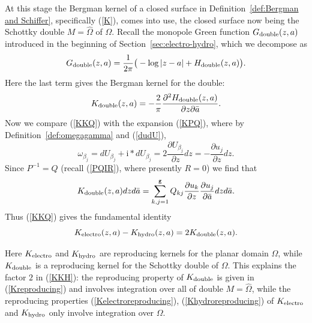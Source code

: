 \documentclass[reqno,12pt]{article}
\theoremstyle{plain}
\theoremstyle{definition}
\numberwithin{equation}{section}
\numberwithin{figure}{section}
\def\I{\mathrm{i}}
\begin{document}
At this stage the Bergman kernel of a closed surface in Definition~\ref{def:Bergman and Schiffer},
specifically (\ref{K}), comes into use, the closed surface now being the Schottky double $M=\hat{\Omega}$ of $\Omega$. 
Recall the monopole Green function $G_{\rm double}(z,a)$ introduced in the beginning of Section~\ref{sec:electro-hydro},
which we decompose as
\begin{equation}\label{Gdouble}
G_{\rm double}(z,a)=\frac{1}{2\pi}\big(-\log |z-a|+H_{\rm double}(z,a)\big).
\end{equation}
Here the last term gives the Bergman kernel for the double:
\begin{equation}
\label{KdoubleH}
K_{\rm double}(z,a)=-\frac{2}{\pi}\frac{\partial^2 H_{\rm double}(z,a)}{\partial z \partial\bar{a}}.
\end{equation}
Now we compare (\ref{KKQ}) with the expansion (\ref{KPQ}), where by Definition~\ref{def:omegagamma}
and (\ref{dudU}),
$$
\omega_{\beta_j}=dU_{\beta_j}+\I*dU_{\beta_j}=2\frac{\partial U_{\beta_j}}{\partial z}dz
=-\frac{\partial u_j}{\partial z}dz.
$$
Since $P^{-1}=Q$ (recall (\ref{PQIR}), where presently $R=0$) we find that
\begin{equation}\label{KQu}
K_{\rm double}(z,a)dzd\bar{a}
=\sum_{k,j=1}^\texttt{g} Q_{kj}\frac{\partial u_k}{\partial z}\frac{\partial u_j}{\partial \bar{a}}dzd\bar{a}.
\end{equation}
Thus (\ref{KKQ}) gives the fundamental identity
\begin{equation}\label{KKH}
K_{\rm electro}(z,a)-K_{\rm hydro}(z,a)=2K_{\rm double}(z,a).
\end{equation}

Here $K_{\rm electro}$ and $K_{\rm hydro}$ are reproducing kernels for the planar domain $\Omega$,
while $K_{\rm double}$ is a reproducing kernel for the Schottky double of $\Omega$.
This explains the factor $2$ in (\ref{KKH}): the
reproducing property of $K_{\rm double}$ is given in (\ref{Kreproducing}) and involves integration over all
of double $M=\hat{\Omega}$, while the reproducing properties (\ref{Kelectroreproducing}), (\ref{Khydroreproducing})
of  $K_{\rm electro}$ and $K_{\rm hydro}$ only involve integration over $\Omega$. 
\end{document}
